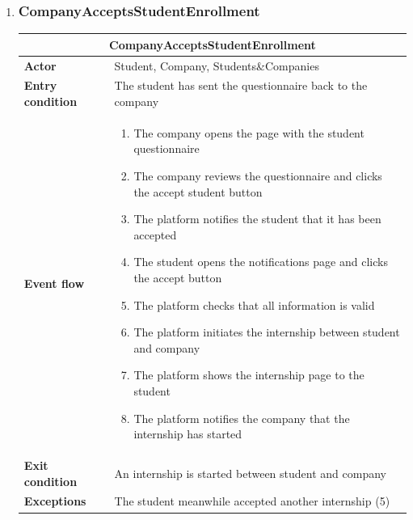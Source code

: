 \begin{enumerate}[label=\textbf{UC\arabic* -}]
\item \subsubsection{CompanyAcceptsStudentEnrollment}

\begin{table}[H]
    \centering
    \begin{tabular}{|l|m{10cm}|}
        \hline \multicolumn{2}{|c|}{\textbf{CompanyAcceptsStudentEnrollment}} \\
        \hline \textbf{Actor} & Student, Company, Students\&Companies \\
        \hline \textbf{Entry condition} & The student has sent the questionnaire back to the company \\
        \hline \textbf{Event flow} &
            \begin{enumerate}[label=\arabic*]
                \item The company opens the page with the student questionnaire
                \item The company reviews the questionnaire and clicks the accept student button
                \item The platform notifies the student that it has been accepted
                \item The student opens the notifications page and clicks the accept button
                \item The platform checks that all information is valid
                \item The platform initiates the internship between student and company
                \item The platform shows the internship page to the student
                \item The platform notifies the company that the internship has started
            \end{enumerate} \\
        \hline \textbf{Exit condition} & An internship is started between student and company \\
        \hline \textbf{Exceptions} & The student meanwhile accepted another internship (5) \\
        \hline
    \end{tabular}
\end{table}


\end{enumerate}
